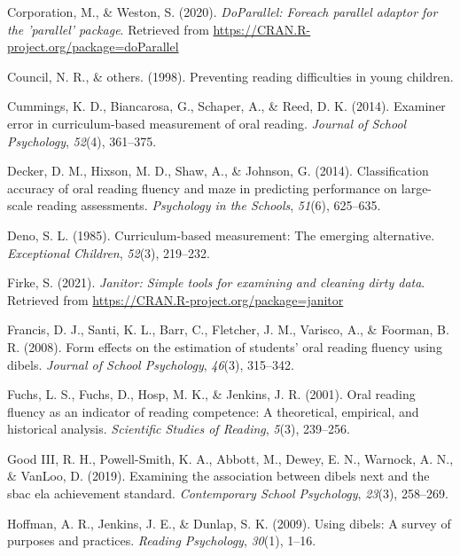\documentclass[
  english,
  man, fleqn, noextraspace]{apa6}
\begin{document}
\leavevmode\hypertarget{ref-R-doParallel}{}%
Corporation, M., \& Weston, S. (2020). \emph{DoParallel: Foreach parallel adaptor for the 'parallel' package}. Retrieved from \url{https://CRAN.R-project.org/package=doParallel}

\leavevmode\hypertarget{ref-national1998}{}%
Council, N. R., \& others. (1998). Preventing reading difficulties in young children.

\leavevmode\hypertarget{ref-cummings2014}{}%
Cummings, K. D., Biancarosa, G., Schaper, A., \& Reed, D. K. (2014). Examiner error in curriculum-based measurement of oral reading. \emph{Journal of School Psychology}, \emph{52}(4), 361--375.

\leavevmode\hypertarget{ref-decker2014}{}%
Decker, D. M., Hixson, M. D., Shaw, A., \& Johnson, G. (2014). Classification accuracy of oral reading fluency and maze in predicting performance on large-scale reading assessments. \emph{Psychology in the Schools}, \emph{51}(6), 625--635.

\leavevmode\hypertarget{ref-deno1985}{}%
Deno, S. L. (1985). Curriculum-based measurement: The emerging alternative. \emph{Exceptional Children}, \emph{52}(3), 219--232.

\leavevmode\hypertarget{ref-R-janitor}{}%
Firke, S. (2021). \emph{Janitor: Simple tools for examining and cleaning dirty data}. Retrieved from \url{https://CRAN.R-project.org/package=janitor}

\leavevmode\hypertarget{ref-francis2008}{}%
Francis, D. J., Santi, K. L., Barr, C., Fletcher, J. M., Varisco, A., \& Foorman, B. R. (2008). Form effects on the estimation of students' oral reading fluency using dibels. \emph{Journal of School Psychology}, \emph{46}(3), 315--342.

\leavevmode\hypertarget{ref-fuchs2001}{}%
Fuchs, L. S., Fuchs, D., Hosp, M. K., \& Jenkins, J. R. (2001). Oral reading fluency as an indicator of reading competence: A theoretical, empirical, and historical analysis. \emph{Scientific Studies of Reading}, \emph{5}(3), 239--256.

\leavevmode\hypertarget{ref-good2019}{}%
Good III, R. H., Powell-Smith, K. A., Abbott, M., Dewey, E. N., Warnock, A. N., \& VanLoo, D. (2019). Examining the association between dibels next and the sbac ela achievement standard. \emph{Contemporary School Psychology}, \emph{23}(3), 258--269.

\leavevmode\hypertarget{ref-hoffman2009}{}%
Hoffman, A. R., Jenkins, J. E., \& Dunlap, S. K. (2009). Using dibels: A survey of purposes and practices. \emph{Reading Psychology}, \emph{30}(1), 1--16.
\end{document}
